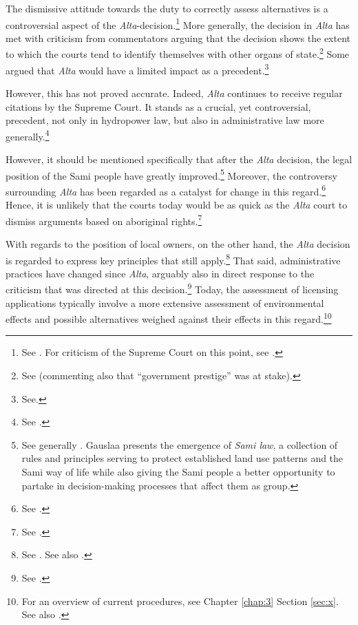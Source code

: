 
The dismissive attitude towards the duty to correctly assess alternatives is a controversial aspect of the {\it Alta}-decision.\footnote{See \cite[311]{falk}. For criticism of the Supreme Court on this point, see \cite[580-584]{backer86}.} More generally, the decision in {\it Alta} has met with criticism from commentators arguing that the decision shows the extent to which the courts tend to identify themselves with other organs of state.\footnote{See \cite[64]{graver88} (commenting also that ``government prestige'' was at stake).} Some argued that {\it Alta} would have a limited impact as a precedent.\footnote{See\cite[580-584]{backer86}.} 

However, this has not proved accurate. Indeed, {\it Alta} continues to receive regular citations by the Supreme Court. It stands as a crucial, yet controversial, precedent, not only in hydropower law, but also in administrative law more generally.\footnote{See \cite{ambassade09,jorpeland11}.}

However, it should be mentioned specifically that after the {\it Alta} decision, the legal position of the Sami people have greatly improved.\footnote{See generally \cite{gausaa07}. Gauslaa presents the emergence of {\it Sami law}, a collection of rules and principles serving to protect established land use patterns and the Sami way of life while also giving the Sami people a better opportunity to partake in decision-making processes that affect them as group.} Moreover, the controversy surrounding {\it Alta} has been regarded as a catalyst for change in this regard.\footnote{See \cite[156]{ravna12s}.} Hence, it is unlikely that the courts today would be as quick as the {\it Alta} court to dismiss arguments based on aboriginal rights.\footnote{See \cite[180]{gausaa07}.}

With regards to the position of local owners, on the other hand, the {\it Alta} decision is regarded to express key principles that still apply.\footnote{See \cite{jorpeland11}. See also \cite[312]{falk}.} That said, administrative practices have changed since {\it Alta}, arguably also in direct response to the criticism that was directed at this decision.\footnote{See \cite[122-123]{backer10}.} Today, the assessment of licensing applications typically involve a more extensive assessment of environmental effects and possible alternatives weighed against their effects in this regard.\footnote{For an overview of current procedures, see Chapter \ref{chap:3} Section \ref{sec:x}. See also \cite[625-659]{backer86}.}


